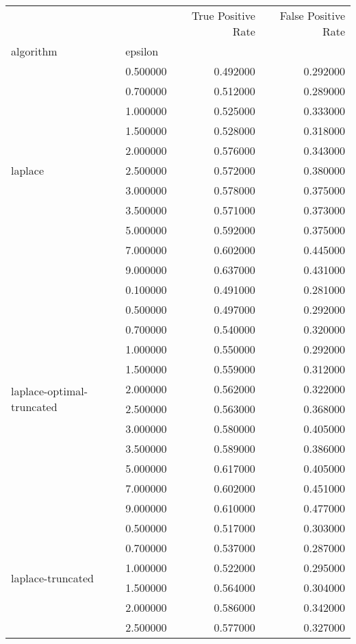 \begin{tabular}{llrr}
\toprule
 &  & True Positive Rate & False Positive Rate \\
algorithm & epsilon &  &  \\
\midrule
\multirow[t]{11}{*}{laplace} & 0.500000 & 0.492000 & 0.292000 \\
 & 0.700000 & 0.512000 & 0.289000 \\
 & 1.000000 & 0.525000 & 0.333000 \\
 & 1.500000 & 0.528000 & 0.318000 \\
 & 2.000000 & 0.576000 & 0.343000 \\
 & 2.500000 & 0.572000 & 0.380000 \\
 & 3.000000 & 0.578000 & 0.375000 \\
 & 3.500000 & 0.571000 & 0.373000 \\
 & 5.000000 & 0.592000 & 0.375000 \\
 & 7.000000 & 0.602000 & 0.445000 \\
 & 9.000000 & 0.637000 & 0.431000 \\
\cline{1-4}
\multirow[t]{12}{*}{laplace-optimal-truncated} & 0.100000 & 0.491000 & 0.281000 \\
 & 0.500000 & 0.497000 & 0.292000 \\
 & 0.700000 & 0.540000 & 0.320000 \\
 & 1.000000 & 0.550000 & 0.292000 \\
 & 1.500000 & 0.559000 & 0.312000 \\
 & 2.000000 & 0.562000 & 0.322000 \\
 & 2.500000 & 0.563000 & 0.368000 \\
 & 3.000000 & 0.580000 & 0.405000 \\
 & 3.500000 & 0.589000 & 0.386000 \\
 & 5.000000 & 0.617000 & 0.405000 \\
 & 7.000000 & 0.602000 & 0.451000 \\
 & 9.000000 & 0.610000 & 0.477000 \\
\cline{1-4}
\multirow[t]{11}{*}{laplace-truncated} & 0.500000 & 0.517000 & 0.303000 \\
 & 0.700000 & 0.537000 & 0.287000 \\
 & 1.000000 & 0.522000 & 0.295000 \\
 & 1.500000 & 0.564000 & 0.304000 \\
 & 2.000000 & 0.586000 & 0.342000 \\
 & 2.500000 & 0.577000 & 0.327000 \\

\end{tabular}
